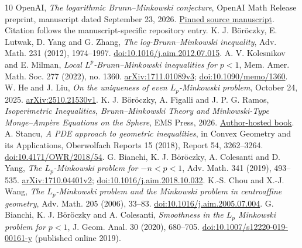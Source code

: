 \documentclass[11pt]{article}
\begin{document}
\begin{thebibliography}{10}
 OpenAI, \emph{The logarithmic Brunn--Minkowski conjecture}, OpenAI Math Release preprint, manuscript dated September 23, 2026. \href{https://github.com/openai/math/blob/adc7f1241b42e322a6451854ab7e4b4c146bf78a/preprints/The-logarithmic-Brunn-Minkowski-conjecture-September-23-2026/paper.pdf}{Pinned source manuscript}. Citation follows the manuscript-specific repository entry.
 K. J. B\"or\"oczky, E. Lutwak, D. Yang and G. Zhang, \emph{The log-Brunn--Minkowski inequality}, Adv. Math. 231 (2012), 1974--1997. \href{https://doi.org/10.1016/j.aim.2012.07.015}{doi:10.1016/j.aim.2012.07.015}.
 A. V. Kolesnikov and E. Milman, \emph{Local $L^p$-Brunn--Minkowski inequalities for $p<1$}, Mem. Amer. Math. Soc. 277 (2022), no. 1360. \href{https://arxiv.org/abs/1711.01089v3}{arXiv:1711.01089v3}; \href{https://doi.org/10.1090/memo/1360}{doi:10.1090/memo/1360}.
 W. He and J. Liu, \emph{On the uniqueness of even $L_p$-Minkowski problem}, October 24, 2025. \href{https://arxiv.org/abs/2510.21530v1}{arXiv:2510.21530v1}.
 K. J. B\"or\"oczky, A. Figalli and J. P. G. Ramos, \emph{Isoperimetric Inequalities, Brunn--Minkowski Theory and Minkowski-Type Monge--Amp\`ere Equations on the Sphere}, EMS Press, 2026. \href{https://www.renyi.hu/~carlos/Book-Brunn-Minkowski.pdf}{Author-hosted book}.
 A. Stancu, \emph{A PDE approach to geometric inequalities}, in Convex Geometry and its Applications, Oberwolfach Reports 15 (2018), Report 54, 3262--3264. \href{https://doi.org/10.4171/OWR/2018/54}{doi:10.4171/OWR/2018/54}.
 G. Bianchi, K. J. B\"or\"oczky, A. Colesanti and D. Yang, \emph{The $L_p$-Minkowski problem for $-n<p<1$}, Adv. Math. 341 (2019), 493--535. \href{https://arxiv.org/abs/1710.04401v2}{arXiv:1710.04401v2}; \href{https://doi.org/10.1016/j.aim.2018.10.032}{doi:10.1016/j.aim.2018.10.032}.
 K.-S. Chou and X.-J. Wang, \emph{The $L_p$-Minkowski problem and the Minkowski problem in centroaffine geometry}, Adv. Math. 205 (2006), 33--83. \href{https://doi.org/10.1016/j.aim.2005.07.004}{doi:10.1016/j.aim.2005.07.004}.
 G. Bianchi, K. J. B\"or\"oczky and A. Colesanti, \emph{Smoothness in the $L_p$ Minkowski problem for $p<1$}, J. Geom. Anal. 30 (2020), 680--705. \href{https://doi.org/10.1007/s12220-019-00161-y}{doi:10.1007/s12220-019-00161-y} (published online 2019).
\end{thebibliography}
\end{document}
